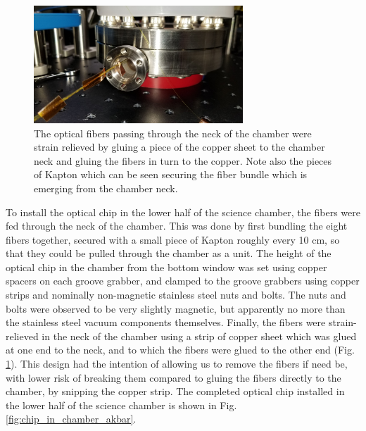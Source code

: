 \begin{figure}[h!]
    \centering
    \includegraphics[width=0.7\textwidth]{Images/chamber_fiber_strain_relief.pdf}
    \caption{The optical fibers passing through the neck of the chamber were strain relieved by gluing a piece of the copper sheet to the chamber neck and gluing the fibers in turn to the copper. Note also the pieces of Kapton which can be seen securing the fiber bundle which is emerging from the chamber neck.}
    \label{fig:chamber_neck_strain_relief.pdf}
\end{figure}

To install the optical chip in the lower half of the science chamber, the fibers were fed through the neck of the chamber. This was done by first bundling the eight fibers together, secured with a small piece of Kapton roughly every 10 cm, so that they could be pulled through the chamber as a unit. The height of the optical chip in the chamber from the bottom window was set using copper spacers on each groove grabber, and clamped to the groove grabbers using copper strips and nominally non-magnetic stainless steel nuts and bolts. The nuts and bolts were observed to be very slightly magnetic, but apparently no more than the stainless steel vacuum components themselves. Finally, the fibers were strain-relieved in the neck of the chamber using a strip of copper sheet which was glued at one end to the neck, and to which the fibers were glued to the other end (Fig. \ref{fig:chamber_neck_strain_relief.pdf}). This design had the intention of allowing us to remove the fibers if need be, with lower risk of breaking them compared to gluing the fibers directly to the chamber, by snipping the copper strip. The completed optical chip installed in the lower half of the science chamber is shown in Fig. \ref{fig:chip_in_chamber_akbar}.

